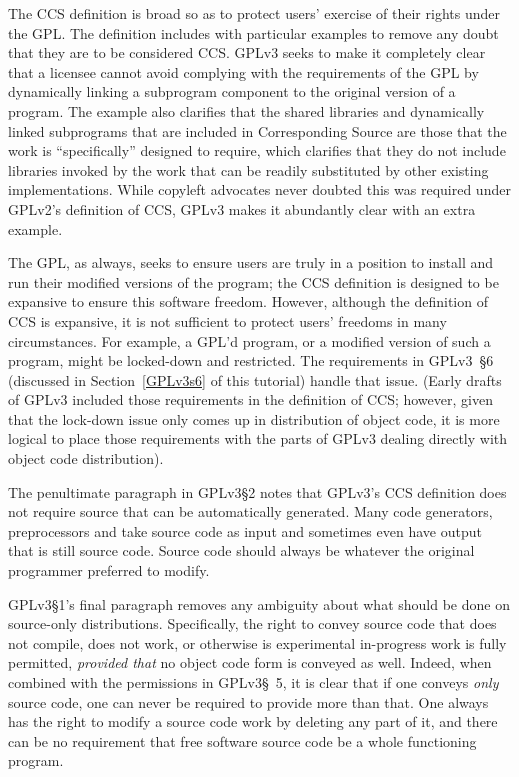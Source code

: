 The CCS definition is broad so as to protect users' exercise of their rights
under the GPL\@.  The definition includes with particular examples to remove
any doubt that they are to be considered CCS\@.  GPLv3 seeks to make it
completely clear that a licensee cannot avoid complying with the requirements
of the GPL by dynamically linking a subprogram component to the original
version of a program.  The example also clarifies that the shared libraries
and dynamically linked subprograms that are included in Corresponding Source
are those that the work is ``specifically'' designed to require, which
clarifies that they do not include libraries invoked by the work that can be
readily substituted by other existing implementations.  While copyleft
advocates never doubted this was required under GPLv2's definition of CCS,
GPLv3 makes it abundantly clear with an extra example.

The GPL, as always, seeks to ensure users are truly in a position to install and
run their modified versions of the program; the CCS definition is designed to
be expansive to ensure this software freedom.  However, although the
definition of CCS is expansive, it is not sufficient to protect users'
freedoms in many circumstances.  For example, a GPL'd program, or a modified
version of such a program, might be locked-down and restricted.  The
requirements in GPLv3~\S6 (discussed in Section~\ref{GPLv3s6} of this
tutorial) handle that issue.  (Early drafts of GPLv3 included those
requirements in the definition of CCS; however, given that the lock-down
issue only comes up in distribution of object code, it is more logical to
place those requirements with the parts of GPLv3 dealing directly with object
code distribution).

The penultimate paragraph in GPLv3\S2 notes that GPLv3's CCS definition does
not require source that can be automatically generated.  Many code
generators, preprocessors and take source code as input and sometimes even
have output that is still source code.  Source code should always be whatever
the original programmer preferred to modify.

GPLv3\S1's final paragraph removes any ambiguity about what should be done on
source-only distributions.  Specifically, the right to convey source code
that does not compile, does not work, or otherwise is experimental
in-progress work is fully permitted, \textit{provided that} no object code
form is conveyed as well.  Indeed, when combined with the permissions in
GPLv3\S~5, it is clear that if one conveys \textit{only} source code, one can
never be required to provide more than that.  One always has the right to
modify a source code work by deleting any part of it, and there can be no
requirement that free software source code be a whole functioning program.

